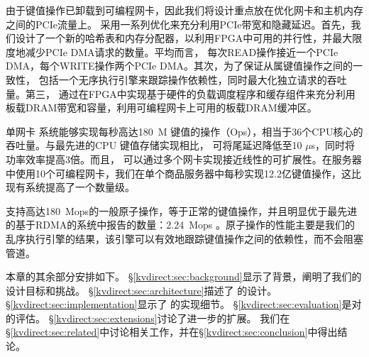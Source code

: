由于键值操作已卸载到可编程网卡，因此我们将设计重点放在优化网卡和主机内存之间的PCIe流量上。 \oursys{} 采用一系列优化来充分利用PCIe带宽和隐藏延迟。首先，我们设计了一个新的哈希表和内存分配器，以利用FPGA中可用的并行性，并最大限度地减少PCIe DMA请求的数量。平均而言，\oursys{} 每次READ操作接近一个PCIe DMA，每个WRITE操作两个PCIe DMA。其次，为了保证从属键值操作之间的一致性，\oursys{} 包括一个无序执行引擎来跟踪操作依赖性，同时最大化独立请求的吞吐量。第三，\oursys{} 通过在FPGA中实现基于硬件的负载调度程序和缓存组件来充分利用板载DRAM带宽和容量，利用可编程网卡上可用的板载DRAM缓冲区。

单网卡 \oursys{} 系统能够实现每秒高达180~M 键值的操作（Ops），相当于36个CPU核心的吞吐量\cite {li2016full}。与最先进的CPU 键值存储实现相比，\oursys{} 可将尾延迟降低至10 $\mu$s，同时将功率效率提高3倍。而且，\oursys{} 可以通过多个网卡实现接近线性的可扩展性。在服务器中使用10个可编程网卡，我们在单个商品服务器中每秒实现12.2亿键值操作，这比现有系统提高了一个数量级。

\oursys{} 支持高达180~Mops的一般原子操作，等于正常的键值操作，并且明显优于最先进的基于RDMA的系统中报告的数量：2.24~Mops \cite {kalia2014using}。原子操作的性能主要是我们的乱序执行引擎的结果，该引擎可以有效地跟踪键值操作之间的依赖性，而不会阻塞管道。

本章的其余部分安排如下。 \S \ref {kvdirect:sec:background}显示了背景，阐明了我们的设计目标和挑战。 \S \ref {kvdirect:sec:architecture}描述了\oursys{} 的设计。 \S \ref {kvdirect:sec:implementation}显示了\oursys{} 的实现细节。 \S \ref {kvdirect:sec:evaluation}是对\oursys{} 的评估。 \S \ref {kvdirect:sec:extensions}讨论了进一步的扩展。 我们在\S \ref {kvdirect:sec:related}中讨论相关工作，并在\S \ref {kvdirect:sec:conclusion}中得出结论。
